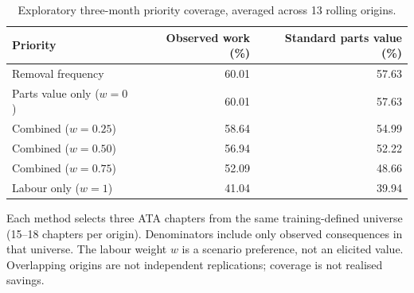 \begin{table}[htbp]
\centering
\caption{Exploratory three-month priority coverage, averaged across 13 rolling origins.}
\label{tab:revised-priority-coverage}
\setlength{\tabcolsep}{5pt}
\begin{tabular}{lrr}
\toprule
Priority & Observed work (\%) & Standard parts value (\%) \\
\midrule
Removal frequency & 60.01 & 57.63 \\
Parts value only ($w=0$) & 60.01 & 57.63 \\
Combined ($w=0.25$) & 58.64 & 54.99 \\
Combined ($w=0.50$) & 56.94 & 52.22 \\
Combined ($w=0.75$) & 52.09 & 48.66 \\
Labour only ($w=1$) & 41.04 & 39.94 \\
\bottomrule
\end{tabular}
\par\smallskip
{\footnotesize Each method selects three ATA chapters from the same training-defined universe (15--18 chapters per origin). Denominators include only observed consequences in that universe. The labour weight $w$ is a scenario preference, not an elicited value. Overlapping origins are not independent replications; coverage is not realised savings.}
\end{table}
